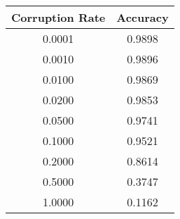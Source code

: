 \begin{tabular}{cc}
\toprule
Corruption Rate & Accuracy \\
\midrule
0.0001 & 0.9898 \\
0.0010 & 0.9896 \\
0.0100 & 0.9869 \\
0.0200 & 0.9853 \\
0.0500 & 0.9741 \\
0.1000 & 0.9521 \\
0.2000 & 0.8614 \\
0.5000 & 0.3747 \\
1.0000 & 0.1162 \\
\bottomrule
\end{tabular}
